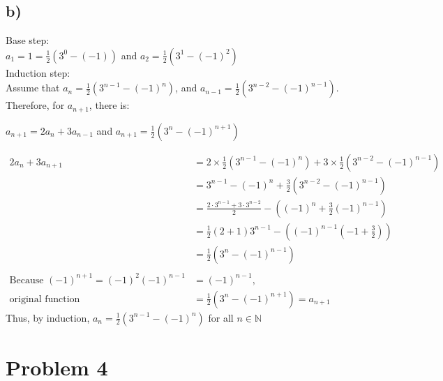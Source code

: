 \documentclass{article}
\begin{document}
    \subsection*{b)}
        Base step:\\
        \(a_1=1=\frac{1}{2} (3^0-(-1))\) and \(a_2=\frac{1}{2} (3^1-(-1)^2)\)\\
        Induction step:\\
        Assume that \(a_n=\frac{1}{2}(3^{n-1}-(-1)^n)\), and \(a_{n-1}=\frac{1}{2}(3^{n-2}-(-1)^{n-1})\).\\
        Therefore, for \(a_{n+1}\), there is:\\
        \begin{center}
            \(a_{n+1}=2a_n+3a_{n-1}\) and \(a_{n+1}=\frac{1}{2}(3^{n}-(-1)^{n+1})\)
        \end{center}
        \begin{align*}
            2a_n+3a_{n+1}&=2\times\frac{1}{2}(3^{n-1}-(-1)^n)+3\times \frac{1}{2}(3^{n-2}-(-1)^{n-1})\\
            &=3^{n-1}-(-1)^n+\frac{3}{2}(3^{n-2}-(-1)^{n-1})\\
            &=\frac{2\cdot 3^{n-1}+3\cdot3^{n-2}}{2}-\left((-1)^{n}+\frac{3}{2}(-1)^{n-1}\right)\\
            &=\frac{1}{2}(2+1)3^{n-1}-((-1)^{n-1}(-1+\frac{3}{2}))\\
            &=\frac{1}{2}(3^n-(-1)^{n-1})\\
            \\
            \text{Because }(-1)^{n+1}=(-1)^2(-1)^{n-1}&=(-1)^{n-1}, \\
            \text{original function}&=\frac{1}{2}(3^n-(-1)^{n+1})=a_{n+1}
        \end{align*}
        Thus, by induction, \(a_n=\frac{1}{2}(3^{n-1}-(-1)^n)\) for all \(n\in \mathbb{N}\)
\newpage
\section*{Problem 4} 
\end{document}
